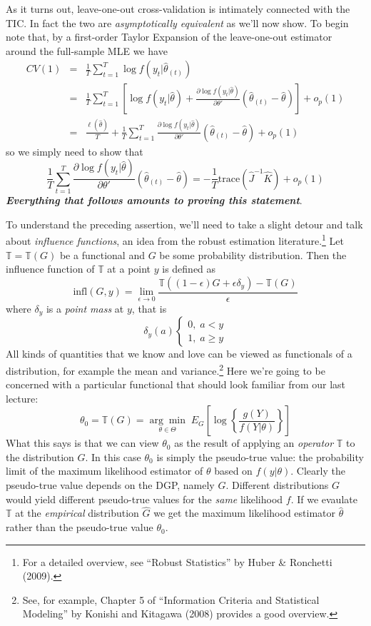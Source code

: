 \documentclass[12pt]{article}
\theoremstyle{definition}
\begin{document}
As it turns out, leave-one-out cross-validation is intimately connected with the TIC. In fact the two are \emph{asymptotically equivalent} as we'll now show. To begin note that, by a first-order Taylor Expansion of the leave-one-out estimator around the full-sample MLE we have
	\begin{eqnarray*}
		CV(1) &=& \frac{1}{T} \sum_{t=1}^T \log f(y_t|\widehat{\theta}_{(t)})\\
			&=&\frac{1}{T} \sum_{t=1}^T \left[\log f(y_t|\widehat{\theta}) + \frac{\partial \log f(y_t|\widehat{\theta})}{\partial \theta'}\left(\widehat{\theta}_{(t)} - \widehat{\theta} \right) \right] + o_p(1)\\
			&=& \frac{\ell(\widehat{\theta})}{T} + \frac{1}{T}\sum_{t=1}^T \frac{\partial \log f(y_t|\widehat{\theta})}{\partial \theta'}\left(\widehat{\theta}_{(t)} - \widehat{\theta} \right) + o_p(1)
	\end{eqnarray*}
so we simply need to show that
	$$\frac{1}{T}\sum_{t=1}^T \frac{\partial \log f(y_t|\widehat{\theta})}{\partial \theta'}\left(\widehat{\theta}_{(t)} - \widehat{\theta} \right) = -\frac{1}{T}\mbox{trace}\left(\widehat{J}^{-1} \widehat{K} \right) + o_p(1)$$
\textbf{\emph{Everything that follows amounts to proving this statement}}. 

To understand the preceding assertion, we'll need to take a slight detour and talk about \emph{influence functions}, an idea from the robust estimation literature.\footnote{For a detailed overview, see ``Robust Statistics'' by Huber \& Ronchetti (2009).} Let $\mathbb{T}=\mathbb{T}(G)$ be a functional and $G$ be some probability distribution. Then the influence function of $\mathbb{T}$ at a point $y$ is defined as 
	$$\mbox{infl}(G,y) = \lim_{\epsilon \rightarrow 0} \frac{\mathbb{T}\left(\left(1-\epsilon\right)G + \epsilon \delta_y\right) - \mathbb{T}(G)}{\epsilon}$$
where $\delta_y$ is a \emph{point mass} at $y$, that is
		$$\delta_y(a)\left\{\begin{array}{c} 0, \; a<y \\ 1, \; a\geq y\end{array} \right.$$
 All kinds of quantities that we know and love can be viewed as functionals of a distribution, for example the mean and variance.\footnote{See, for example, Chapter 5 of ``Information Criteria and Statistical Modeling'' by Konishi and Kitagawa (2008) provides a good overview.} Here we're going to be concerned with a particular functional that should look familiar from our last lecture:
	$$\theta_0 = \mathbb{T}(G) = \underset{\theta \in \Theta}{\arg \min} \;E_G\left[\log\left\{\frac{g(Y)}{f(Y|\theta)} \right\} \right]$$
What this says is that we can view $\theta_0$ as the result of applying an \emph{operator} $\mathbb{T}$ to the distribution $G$. In this case $\theta_0$ is simply the pseudo-true value: the probability limit of the maximum likelihood estimator of $\theta$ based on $f(y|\theta)$. Clearly the pseudo-true value depends on the DGP, namely $G$. Different distributions $G$ would yield different pseudo-true values for the \emph{same} likelihood $f$. If we evaulate $\mathbb{T}$ at the \emph{empirical} distribution $\widehat{G}$ we get the maximum likelihood estimator $\widehat{\theta}$ rather than the pseudo-true value $\theta_0$.
\end{document}
